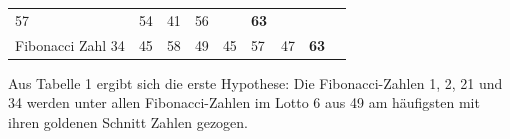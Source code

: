 \documentclass[ngerman,]{article}
\begin{document}
\begin{longtable}[]{@{}lllllllll@{}}
\begin{minipage}[t]{0.07\columnwidth}
57\strut
\end{minipage} & \begin{minipage}[t]{0.07\columnwidth}\raggedright\strut
54\strut
\end{minipage} & \begin{minipage}[t]{0.07\columnwidth}\raggedright\strut
41\strut
\end{minipage} & \begin{minipage}[t]{0.07\columnwidth}\raggedright\strut
56\strut
\end{minipage} & \begin{minipage}[t]{0.07\columnwidth}\raggedright\strut
\strut
\end{minipage} & \begin{minipage}[t]{0.07\columnwidth}\raggedright\strut
\textbf{63}\strut
\end{minipage}\tabularnewline
\begin{minipage}[t]{0.19\columnwidth}\raggedright\strut
Fibonacci Zahl 34\strut
\end{minipage} & \begin{minipage}[t]{0.07\columnwidth}\raggedright\strut
45\strut
\end{minipage} & \begin{minipage}[t]{0.07\columnwidth}\raggedright\strut
58\strut
\end{minipage} & \begin{minipage}[t]{0.07\columnwidth}\raggedright\strut
49\strut
\end{minipage} & \begin{minipage}[t]{0.07\columnwidth}\raggedright\strut
45\strut
\end{minipage} & \begin{minipage}[t]{0.07\columnwidth}\raggedright\strut
57\strut
\end{minipage} & \begin{minipage}[t]{0.07\columnwidth}\raggedright\strut
47\strut
\end{minipage} & \begin{minipage}[t]{0.07\columnwidth}\raggedright\strut
\textbf{63}\strut
\end{minipage} & \begin{minipage}[t]{0.07\columnwidth}\raggedright\strut
\strut
\end{minipage}\tabularnewline
\bottomrule
\end{longtable}

Aus Tabelle 1 ergibt sich die erste Hypothese: Die Fibonacci-Zahlen 1,
2, 21 und 34 werden unter allen Fibonacci-Zahlen im Lotto 6 aus 49 am
häufigsten mit ihren goldenen Schnitt Zahlen gezogen.
\end{document}
